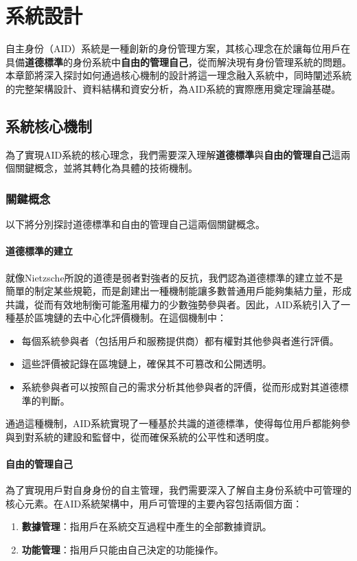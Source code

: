 
\chapter{系統設計}
自主身份（AID）系統是一種創新的身份管理方案，其核心理念在於讓每位用戶在具備\textbf{道德標準}的身份系統中\textbf{自由的管理自己}，從而解決現有身份管理系統的問題。本章節將深入探討如何通過核心機制的設計將這一理念融入系統中，同時闡述系統的完整架構設計、資料結構和資安分析，為AID系統的實際應用奠定理論基礎。
\section{系統核心機制}
為了實現AID系統的核心理念，我們需要深入理解\textbf{道德標準}與\textbf{自由的管理自己}這兩個關鍵概念，並將其轉化為具體的技術機制。
\subsection{關鍵概念}
以下將分別探討道德標準和自由的管理自己這兩個關鍵概念。
\subsubsection{道德標準的建立}
就像Nietzsche所說的道德是弱者對強者的反抗，我們認為道德標準的建立並不是簡單的制定某些規範，而是創建出一種機制能讓多數普通用戶能夠集結力量，形成共識，從而有效地制衡可能濫用權力的少數強勢參與者。因此，AID系統引入了一種基於區塊鏈的去中心化評價機制。在這個機制中：
\begin{itemize}
  \item 每個系統參與者（包括用戶和服務提供商）都有權對其他參與者進行評價。
  \item 這些評價被記錄在區塊鏈上，確保其不可篡改和公開透明。
  \item 系統參與者可以按照自己的需求分析其他參與者的評價，從而形成對其道德標準的判斷。
\end{itemize}
通過這種機制，AID系統實現了一種基於共識的道德標準，使得每位用戶都能夠參與到對系統的建設和監督中，從而確保系統的公平性和透明度。
\subsubsection{自由的管理自己}
為了實現用戶對自身身份的自主管理，我們需要深入了解自主身份系統中可管理的核心元素。在AID系統架構中，用戶可管理的主要內容包括兩個方面：
\begin{enumerate}
  \item \textbf{數據管理}：指用戶在系統交互過程中產生的全部數據資訊。
  \item \textbf{功能管理}：指用戶只能由自己決定的功能操作。
\end{enumerate}

